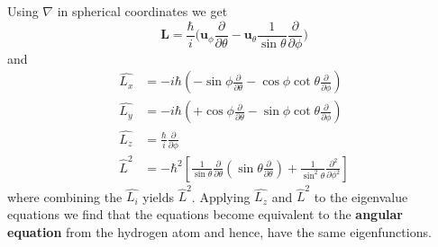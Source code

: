 Using $\nabla$ in spherical coordinates we get
\begin{equation*}
    \mathbf{L}=\frac{\hbar}{i}\Bigg(\mathbf{u}_{\phi}\frac{\partial}{\partial\theta}-\mathbf{u}_{\theta}\frac{1}{\sin\theta}\frac{\partial}{\partial\phi}\Bigg)
\end{equation*}
and
\begin{align*}
    \widehat{L_{x}} & =-i\hbar\left(-\sin\phi\frac{\partial}{\partial\theta}-\cos\phi\cot\theta\frac{\partial}{\partial\phi}\right)                                                                        \\
    \widehat{L_{y}} & =-i\hbar\left(+\cos\phi\frac{\partial}{\partial\theta}-\sin\phi\cot\theta\frac{\partial}{\partial\phi}\right)                                                                        \\
    \widehat{L_{z}} & =\frac{\hbar}{i}\frac{\partial}{\partial\phi}                                                                                                                                        \\
    \hat{L}^{2}     & =-\hbar^{2}\left[\frac{1}{\sin\theta}\frac{\partial}{\partial\theta}(\sin\theta\frac{\partial}{\partial\theta})+\frac{1}{\sin^{2}\theta}\frac{\partial^{2}}{\partial\phi^{2}}\right]
\end{align*}
where combining the $\widehat{L_{i}}$ yields $\hat{L}^{2}$. Applying $\widehat{L_{z}}$ and $\hat{L}^{2}$ to the eigenvalue equations we find that the equations become equivalent to the \textbf{angular equation} from the hydrogen atom and hence, have the same eigenfunctions.

